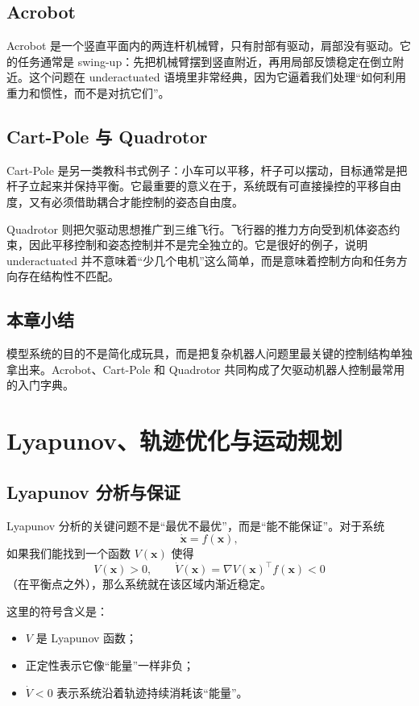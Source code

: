 \documentclass[a4paper]{article}
\newcommand{\bx}{\mathbf{x}}
\begin{document}
\subsection{Acrobot}

Acrobot 是一个竖直平面内的两连杆机械臂，只有肘部有驱动，肩部没有驱动。它的任务通常是 swing-up：先把机械臂摆到竖直附近，再用局部反馈稳定在倒立附近。这个问题在 underactuated 语境里非常经典，因为它逼着我们处理“如何利用重力和惯性，而不是对抗它们”。

\subsection{Cart-Pole 与 Quadrotor}

Cart-Pole 是另一类教科书式例子：小车可以平移，杆子可以摆动，目标通常是把杆子立起来并保持平衡。它最重要的意义在于，系统既有可直接操控的平移自由度，又有必须借助耦合才能控制的姿态自由度。

Quadrotor 则把欠驱动思想推广到三维飞行。飞行器的推力方向受到机体姿态约束，因此平移控制和姿态控制并不是完全独立的。它是很好的例子，说明 underactuated 并不意味着“少几个电机”这么简单，而是意味着控制方向和任务方向存在结构性不匹配。

\subsection{本章小结}

模型系统的目的不是简化成玩具，而是把复杂机器人问题里最关键的控制结构单独拿出来。Acrobot、Cart-Pole 和 Quadrotor 共同构成了欠驱动机器人控制最常用的入门字典。

\section{Lyapunov、轨迹优化与运动规划}

\subsection{Lyapunov 分析与保证}

Lyapunov 分析的关键问题不是“最优不最优”，而是“能不能保证”。对于系统
\[
\dot{\bx} = f(\bx),
\]
如果我们能找到一个函数 $V(\bx)$ 使得
\[
V(\bx) > 0,\qquad \dot{V}(\bx) = \nabla V(\bx)^\top f(\bx) < 0
\]
（在平衡点之外），那么系统就在该区域内渐近稳定。

这里的符号含义是：
\begin{itemize}
  \item $V$ 是 Lyapunov 函数；
  \item 正定性表示它像“能量”一样非负；
  \item $\dot V < 0$ 表示系统沿着轨迹持续消耗该“能量”。
\end{itemize}
\end{document}
